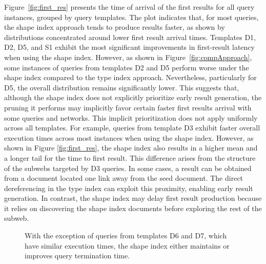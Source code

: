 Figure~\ref{fig:first_res} presents the time of arrival of the first results for all query instances, grouped by query templates. 
The plot indicates that, for most queries, the shape index approach tends to produce results faster, as shown by distributions concentrated around lower first result arrival times.
Templates D1, D2, D5, and S1 exhibit the most significant improvements in first-result latency when using the shape index.
However, as shown in Figure~\ref{fig:compApproach}, some instances of queries from templates D2 and D5 perform worse under the shape index compared to the type index approach.
Nevertheless, particularly for D5, the overall distribution remains significantly lower.
This suggests that, although the shape index does not explicitly prioritize early result generation, the pruning it performs may implicitly favor certain faster first results arrival with some queries and networks. 
This implicit prioritization does not apply uniformly across all templates. 
For example, queries from template D3 exhibit faster overall execution times across most instances when using the shape index.
However, as shown in Figure \ref{fig:first_res}, the shape index also results in a higher mean and a longer tail for the time to first result.
This difference arises from the structure of the subwebs targeted by D3 queries.
In some cases, a result can be obtained from a document located one link away from the seed document.
The direct dereferencing in the type index can exploit this proximity, enabling early result generation.
In contrast, the shape index may delay first result production because it relies on discovering the shape index documents before exploring the rest of the subweb.


\begin{figure}
    \centering
    
    \caption{With the exception of queries from templates D6 and D7, which have similar execution times, the shape index either maintains or improves query termination time.}
    \label{fig:termination_time}
\end{figure}

